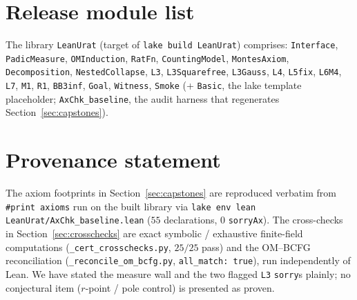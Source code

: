 \documentclass[11pt]{article}
\newcommand{\code}[1]{\texttt{#1}}
\begin{document}
\section{Release module list}\label{sec:modules}

The library \code{LeanUrat} (target of \code{lake build LeanUrat}) comprises:
\code{Interface}, \code{PadicMeasure}, \code{OMInduction}, \code{RatFn},
\code{CountingModel}, \code{MontesAxiom}, \code{Decomposition}, \code{NestedCollapse},
\code{L3}, \code{L3Squarefree}, \code{L3Gauss}, \code{L4}, \code{L5fix}, \code{L6M4},
\code{L7}, \code{M1}, \code{R1}, \code{BB3inf}, \code{Goal}, \code{Witness}, \code{Smoke}
(+ \code{Basic}, the lake template placeholder; \code{AxChk\_baseline}, the audit harness
that regenerates Section~\ref{sec:capstones}).

\section*{Provenance statement}
The axiom footprints in Section~\ref{sec:capstones} are reproduced verbatim from
\code{\#print axioms} run on the built library via
\code{lake env lean LeanUrat/AxChk\_baseline.lean} ($55$ declarations, $0$ \code{sorryAx}).
The cross-checks in Section~\ref{sec:crosschecks} are exact symbolic / exhaustive
finite-field computations (\code{\_cert\_crosschecks.py}, $25/25$ pass) and the OM--BCFG
reconciliation (\code{\_reconcile\_om\_bcfg.py}, \code{all\_match: true}), run
independently of Lean. We have stated the measure wall and the two flagged \code{L3}
\code{sorry}s plainly; no conjectural item ($r$-point / pole control) is presented as
proven.
\end{document}
